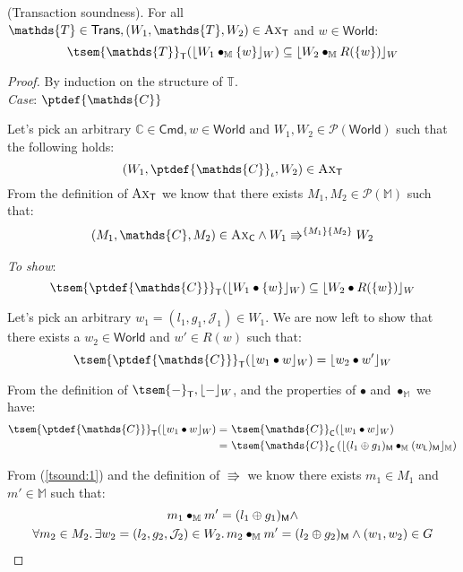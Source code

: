\begin{thm}
	\label{thm:soundTrans}
	(Transaction soundness).
	For all $\mathds{T} \in \mathsf{Trans}, (W_1, \mathds{T}, W_2) \in \textsc{Ax}_\mathsf{T}$ and $w \in \mathsf{World}$:
	\[
		\tsem{\mathds{T}}_\mathsf{T}(\lfloor W_1 \bullet_\mathbb{M} \{ w \} \rfloor_W) \subseteq \lfloor W_2 \bullet_\mathbb{M} R(\{ w \}) \rfloor_W
	\]
	
	{\parindent0pt
	\begin{proof}
	By induction on the structure of $\mathds{T}$. \\	
	
	\textit{Case}: $\ptdef{\mathds{C}}$
	
	Let's pick an arbitrary $\mathds{C} \in \mathsf{Cmd}, w \in \mathsf{World}$ and $W_1, W_2 \in \mathcal{P}(\mathsf{World})$ such that the following holds:
	\[
		(W_1, \ptdef{\mathds{C}}_\iota, W_2) \in \textsc{Ax}_\mathsf{T}
	\]
	From the definition of $\textsc{Ax}_\mathsf{T}$ we know that there exists $M_1, M_2 \in \mathcal{P}(\mathbb{M})$ such that:
	\begin{gather}\label{tsound:1}
		(M_1, \mathds{C}, M_2) \in \textsc{Ax}_\mathsf{C} \land W_1 \Rrightarrow^{\{M_1\}\{M_2\}} W_2
	\end{gather}
	
	\textit{To show}:
	\[
		\tsem{\ptdef{\mathds{C}}}_\mathsf{T}(\lfloor W_1 \bullet \{w\} \rfloor_W) \subseteq \lfloor W_2 \bullet R(\{w\}) \rfloor_W
	\]
	
	Let's pick an arbitrary $w_1 = (l_1, g_1, \mathcal{J}_1) \in W_1$. We are now left to show that there exists a $w_2 \in \mathsf{World}$ and $w' \in R(w)$ such that:
	\[
		\tsem{\ptdef{\mathds{C}}}_\mathsf{T}(\lfloor w_1 \bullet w \rfloor_W) = \lfloor w_2 \bullet w' \rfloor_W
	\]
	
	From the definition of $\tsem{-}_\mathsf{T}, \lfloor - \rfloor_W$, and the properties of $\bullet$ and $\bullet_\mathbb{M}$ we have:
	\begin{align}
		\tsem{\ptdef{\mathds{C}}}_\mathsf{T}(\lfloor w_1 \bullet w \rfloor_W) =\
			&\tsem{\mathds{C}}_\mathsf{C}(\lfloor w_1 \bullet w \rfloor_W) \\
			\label{tsound:2} =\ &\tsem{\mathds{C}}_\mathsf{C}\left( \lfloor (l_1 \oplus g_1)_\mathsf{M} \bullet_\mathbb{M} (w_\mathsf{L})_\mathsf{M} \rfloor_\mathbb{M} \right)
	\end{align}
	
	From (\ref{tsound:1}) and the definition of $\Rrightarrow$ we know there exists $m_1 \in M_1$ and $m' \in \mathbb{M}$ such that:
	\begin{gather}
	\label{tsound:3} m_1 \bullet_\mathbb{M} m' = (l_1 \oplus g_1)_\mathsf{M} \land \\
	\label{tsound:4} \forall m_2 \in M_2 \ldotp \exists w_2 = (l_2, g_2, \mathcal{J}_2) \in W_2 \ldotp m_2 \bullet_\mathbb{M} m' = (l_2 \oplus g_2)_\mathsf{M} \land (w_1, w_2) \in G
	\end{gather}
	

\end{proof}}
\end{thm}
